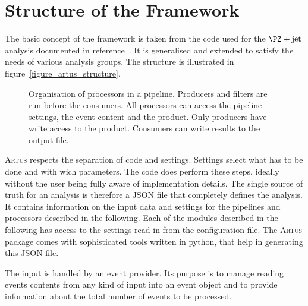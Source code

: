 \documentclass[3p]{elsarticle}
\newcommand{\software}[1]{\textsc{#1}\xspace}
\newcommand{\artus}{\software{Artus}}
\begin{document}
\section{Structure of the Framework \label{section_artus_structure}}

The basic concept of the framework is taken from the code used for the $\PZ+\text{jet}$ analysis documented in reference~\cite{joram_phd}.
It is generalised and extended to satisfy the needs of various analysis groups.
The structure is illustrated in figure~\ref{figure_artus_structure}.

\begin{figure}[p]
\centering 
\caption[Structure of an \artus analysis.]{Structure of an \artus analysis.
The input is read by an event provider.
Within the pipelines the event content is analysed by the processors.
Consumers in local pipelines write results to a common output.
All parts of the analysis are configurable.}
\label{figure_artus_structure}

\vspace{10ex}

\centering 
\caption[Organisation of processors in a pipeline.]{Organisation of processors in a pipeline.
Producers and filters are run before the consumers.
All processors can access the pipeline settings, the event content and the product.
Only producers have write access to the product.
Consumers can write results to the output file.}
\label{figure_artus_pipeline}
\end{figure}

\artus respects the separation of code and settings.
Settings select what has to be done and with wich parameters.
The code does perform these steps, ideally without the user being fully aware of implementation details.
The single source of truth for an analysis is therefore a JSON file that completely defines the analysis.
It contains information on the input data and settings for the pipelines and processors described in the following.
Each of the modules described in the following has access to the settings read in from the configuration file.
The \artus package comes with sophisticated tools written in python, that help in generating this JSON file.

The input is handled by an event provider.
Its purpose is to manage reading events contents from any kind of input into an event object and to provide information about the total number of events to be processed.
\end{document}
